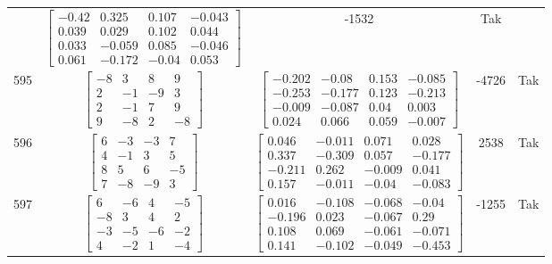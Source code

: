 \documentclass[a4paper,12pt]{article}
\begin{document}
\begin{tabular}{c c c c c}
&
$\begin{bmatrix} -0.42 & 0.325 & 0.107 & -0.043 \\ 0.039 & 0.029 & 0.102 & 0.044 \\ 0.033 & -0.059 & 0.085 & -0.046 \\ 0.061 & -0.172 & -0.04 & 0.053 \end{bmatrix}$
&
-1532
&
Tak
\\
595
&
$\begin{bmatrix} -8 & 3 & 8 & 9 \\ 2 & -1 & -9 & 3 \\ 2 & -1 & 7 & 9 \\ 9 & -8 & 2 & -8 \end{bmatrix}$
&
$\begin{bmatrix} -0.202 & -0.08 & 0.153 & -0.085 \\ -0.253 & -0.177 & 0.123 & -0.213 \\ -0.009 & -0.087 & 0.04 & 0.003 \\ 0.024 & 0.066 & 0.059 & -0.007 \end{bmatrix}$
&
-4726
&
Tak
\\
596
&
$\begin{bmatrix} 6 & -3 & -3 & 7 \\ 4 & -1 & 3 & 5 \\ 8 & 5 & 6 & -5 \\ 7 & -8 & -9 & 3 \end{bmatrix}$
&
$\begin{bmatrix} 0.046 & -0.011 & 0.071 & 0.028 \\ 0.337 & -0.309 & 0.057 & -0.177 \\ -0.211 & 0.262 & -0.009 & 0.041 \\ 0.157 & -0.011 & -0.04 & -0.083 \end{bmatrix}$
&
2538
&
Tak
\\
597
&
$\begin{bmatrix} 6 & -6 & 4 & -5 \\ -8 & 3 & 4 & 2 \\ -3 & -5 & -6 & -2 \\ 4 & -2 & 1 & -4 \end{bmatrix}$
&
$\begin{bmatrix} 0.016 & -0.108 & -0.068 & -0.04 \\ -0.196 & 0.023 & -0.067 & 0.29 \\ 0.108 & 0.069 & -0.061 & -0.071 \\ 0.141 & -0.102 & -0.049 & -0.453 \end{bmatrix}$
&
-1255
&
Tak
\\

\end{tabular}
\end{document}
